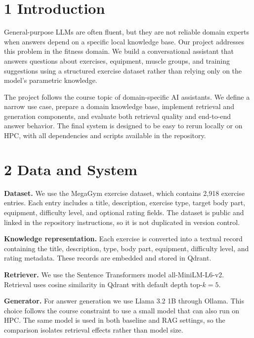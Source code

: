 \documentclass[fleqn,moreauthors,10pt]{ds_report}
\affiliation{\textit{Advisors: Ale\v{s} \v{Z}agar}}
\begin{document}
\flushbottom
\maketitle
\thispagestyle{empty}
\fancyhf{}
\fancyhead[R]{\small\sffamily\bfseries \thepage/\pageref{LastPage}}
\renewcommand{\headrulewidth}{0pt}
\setlength{\headheight}{14pt}

\section*{1 Introduction}

General-purpose LLMs are often fluent, but they are not reliable domain experts when answers depend on a specific local knowledge base. Our project addresses this problem in the fitness domain. We build a conversational assistant that answers questions about exercises, equipment, muscle groups, and training suggestions using a structured exercise dataset rather than relying only on the model's parametric knowledge.

The project follows the course topic of domain-specific AI assistants. We define a narrow use case, prepare a domain knowledge base, implement retrieval and generation components, and evaluate both retrieval quality and end-to-end answer behavior. The final system is designed to be easy to rerun locally or on HPC, with all dependencies and scripts available in the repository.

\section*{2 Data and System}

\textbf{Dataset.} We use the MegaGym exercise dataset, which contains 2,918 exercise entries. Each entry includes a title, description, exercise type, target body part, equipment, difficulty level, and optional rating fields. The dataset is public and linked in the repository instructions, so it is not duplicated in version control.

\textbf{Knowledge representation.} Each exercise is converted into a textual record containing the title, description, type, body part, equipment, difficulty level, and rating metadata. These records are embedded and stored in Qdrant.

\textbf{Retriever.} We use the Sentence Transformers model all-MiniLM-L6-v2. Retrieval uses cosine similarity in Qdrant with default depth top-$k=5$.

\textbf{Generator.} For answer generation we use Llama 3.2 1B through Ollama. This choice follows the course constraint to use a small model that can also run on HPC. The same model is used in both baseline and RAG settings, so the comparison isolates retrieval effects rather than model size.
\end{document}
